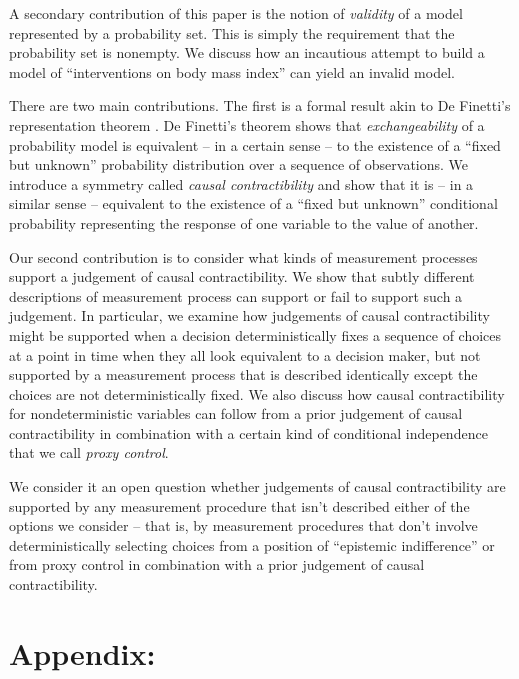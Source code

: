 \documentclass{article}
\theoremstyle{plain}
\theoremstyle{definition}
\begin{document}
A secondary contribution of this paper is the notion of \emph{validity} of a model represented by a probability set. This is simply the requirement that the probability set is nonempty.  We discuss how an incautious attempt to build a model of ``interventions on body mass index'' can yield an invalid model.

There are two main contributions. The first is a formal result akin to De Finetti's representation theorem \citep{de_finetti_foresight_1992}. De Finetti's theorem shows that \emph{exchangeability} of a probability model is equivalent -- in a certain sense -- to the existence of a ``fixed but unknown'' probability distribution over a sequence of observations. We introduce a symmetry called \emph{causal contractibility} and show that it is -- in a similar sense -- equivalent to the existence of a ``fixed but unknown'' conditional probability representing the response of one variable to the value of another.

Our second contribution is to consider what kinds of measurement processes support a judgement of causal contractibility. We show that subtly different descriptions of measurement process can support or fail to support such a judgement. In particular, we examine how judgements of causal contractibility might be supported when a decision deterministically fixes a sequence of choices at a point in time when they all look equivalent to a decision maker, but not supported by a measurement process that is described identically except the choices are not deterministically fixed. We also discuss how causal contractibility for nondeterministic variables can follow from a prior judgement of causal contractibility in combination with a certain kind of conditional independence that we call \emph{proxy control}.

We consider it an open question whether judgements of causal contractibility are supported by any measurement procedure that isn't described either of the options we consider -- that is, by measurement procedures that don't involve deterministically selecting choices from a position of ``epistemic indifference'' or from proxy control in combination with a prior judgement of causal contractibility.










% 
% 
% 
% 




\appendix
\newpage
\section*{Appendix:}

% 
\end{document}
